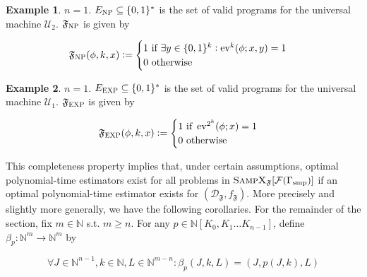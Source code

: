 \documentclass[11pt]{article}
\numberwithin{equation}{section}
\theoremstyle{definition}
\newtheorem{example}{Example}[section]
\theoremstyle{plain}
\newcommand{\Bool}{\{0,1\}}
\newcommand{\Words}{{\Bool^*}}
\DeclareMathOperator{\Ev}{ev}
\newcommand{\Nats}{\mathbb{N}}
\newcommand{\NatPoly}{\Nats[K_0, K_1 \ldots K_{n-1}]}
\newcommand{\Dist}{\mathcal{D}}
\newcommand{\Fall}{\mathcal{F}}
\begin{document}
\begin{samepage}
\begin{example}

${n = 1}$. ${E_{\textsc{NP}} \subseteq \Words}$ is the set of valid programs for the universal machine ${\mathcal{U}_2}$. ${\mathfrak{F}_{\textsc{NP}}}$ is given by 

\begin{equation}
\mathfrak{F}_{\textsc{NP}}(\phi,k,x):=\begin{cases}1 \text{ if } \exists y\in \Bool^k: \Ev^k(\phi;x,y)=1 \\ 0 \text { otherwise} \end{cases}
\end{equation}

\end{example}
\end{samepage}

\begin{samepage}
\begin{example}

${n = 1}$. ${E_{\textsc{EXP}} \subseteq \Words}$ is the set of valid programs for the universal machine ${\mathcal{U}_1}$. ${\mathfrak{F}_{\textsc{EXP}}}$ is given by 

\begin{equation}
\mathfrak{F}_{\textsc{EXP}}(\phi,k,x):=\begin{cases}1 \text{ if } \Ev^{2^k}(\phi;x)=1 \\ 0 \text { otherwise} \end{cases}
\end{equation}

\end{example}
\end{samepage}

This completeness property implies that, under certain assumptions, optimal polynomial-time estimators exist for all problems in ${\textsc{SampX}_\mathfrak{F}[\Fall(\Gamma_{\text{smp}})]}$ if an optimal polynomial-time estimator exists for ${(\Dist_{\mathfrak{F}},f_{\mathfrak{F}})}$. More precisely and slightly more generally, we have the following corollaries. For the remainder of the section, fix ${m \in \Nats}$ s.t. ${m \geq n}$. For any ${p \in \NatPoly}$, define ${\beta_p: \Nats^m \rightarrow \Nats^m}$ by 

\begin{equation}
\forall J \in \Nats^{n-1}, k \in \Nats, L \in \Nats^{m-n}: \beta_p(J,k,L)=(J,p(J,k),L)
\end{equation}
\end{document}

